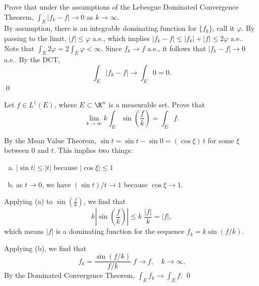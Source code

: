 \begin{hwsol}
Prove that under the assumptions of the Lebesgue Dominated Convergence Theorem, $\int_E |f_k-f| \to 0$ as $k \to \infty$. \\

\pf By assumption, there is an integrable dominating function for $\{f_k\}$, call it $\varphi$. By passing to the limit, $|f| \leq \varphi$ a.e., which implies $|f_k - f| \leq |f_k|+|f| \leq 2\varphi$ a.e.. Note that $\int_E 2\varphi= 2 \int_E \varphi < \infty$. Since  $f_k \to f$ a.e., it follows that $|f_k - f| \to 0$ a.e.. By the DCT,
        \[
        \int_E |f_k - f| \to \int_E 0= 0.
        \] \qed \\
\end{hwsol}


\begin{hwsol}
Let $f \in L^1(E)$, where $E \subset \R^n$ is a measurable set. Prove that
        \[
        \lim_{k \to \infty} k \int_E \sin \left( \frac{f }{k} \right)= \int_E f.
         \]
 
\pf By the Mean Value Theorem, $\sin t= \sin t - \sin 0= (\cos \xi) \, t$ for some $\xi$ between $0$ and $t$. This implies two things: 
	\begin{enumerate}[(a)]
	\item $|\sin t| \leq |t|$ because $|\cos \xi| \leq 1$
	\item as $ t \to 0$, we have $(\sin t)/t \to 1$ because $\cos \xi \to 1$.
	\end{enumerate}  
Applying (a) to $\sin \left( \frac{f }{k} \right)$, we find that 
        \[
        k \left| \sin \left( \frac{f }{k} \right) \right| \leq k \;\frac{|f|}{k}= |f|,
        \]
which means $|f|$ is a dominating function for the sequence $f_k= k \sin(f/k)$. 

Applying (b), we find that 
        \[
        f_k= \frac{\sin(f/k)}{f/k}\; f \to f, \quad k \to \infty.
        \]
By the Dominated Convergence Theorem, $\int_E f_k \to \int_E f$. \qed \\
\end{hwsol}


